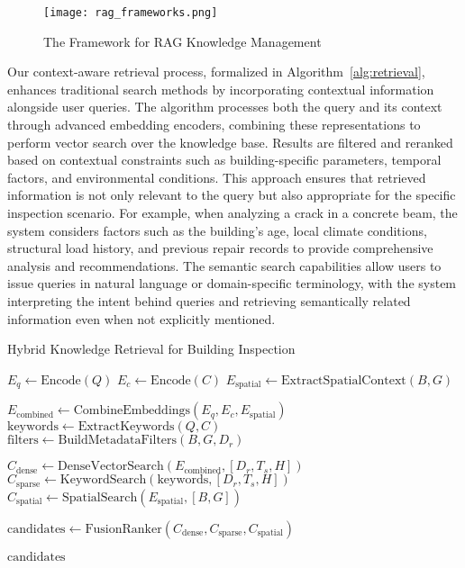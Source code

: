\documentclass[a4paper,fleqn]{cas-sc}
\begin{document}
\begin{figure}
    \centering
    \texttt{[image: rag\_frameworks.png]}
    \caption{The Framework for RAG Knowledge Management}
    \label{fig:enter-label}
\end{figure}

Our context-aware retrieval process, formalized in Algorithm~\ref{alg:retrieval}, enhances traditional search methods by incorporating contextual information alongside user queries. The algorithm processes both the query and its context through advanced embedding encoders, combining these representations to perform vector search over the knowledge base. Results are filtered and reranked based on contextual constraints such as building-specific parameters, temporal factors, and environmental conditions. This approach ensures that retrieved information is not only relevant to the query but also appropriate for the specific inspection scenario. For example, when analyzing a crack in a concrete beam, the system considers factors such as the building's age, local climate conditions, structural load history, and previous repair records to provide comprehensive analysis and recommendations. The semantic search capabilities allow users to issue queries in natural language or domain-specific terminology, with the system interpreting the intent behind queries and retrieving semantically related information even when not explicitly mentioned.

\begin{algorithm}[hbt!]
\caption{Hybrid Knowledge Retrieval for Building Inspection}\label{alg:retrieval}

$E_q \gets \text{Encode}(Q)$\;
$E_c \gets \text{Encode}(C)$\;
$E_{\text{spatial}} \gets \text{ExtractSpatialContext}(B, G)$\;

$E_{\text{combined}} \gets \text{CombineEmbeddings}(E_q, E_c, E_{\text{spatial}})$\;
$\text{keywords} \gets \text{ExtractKeywords}(Q, C)$\;
$\text{filters} \gets \text{BuildMetadataFilters}(B, G, D_r)$\;

$C_{\text{dense}} \gets \text{DenseVectorSearch}(E_{\text{combined}}, [D_r, T_s, H])$\;
$C_{\text{sparse}} \gets \text{KeywordSearch}(\text{keywords}, [D_r, T_s, H])$\;
$C_{\text{spatial}} \gets \text{SpatialSearch}(E_{\text{spatial}}, [B, G])$\;

$\text{candidates} \gets \text{FusionRanker}(C_{\text{dense}}, C_{\text{sparse}}, C_{\text{spatial}})$\;

\Return $\text{candidates}$
\end{algorithm}
\end{document}
